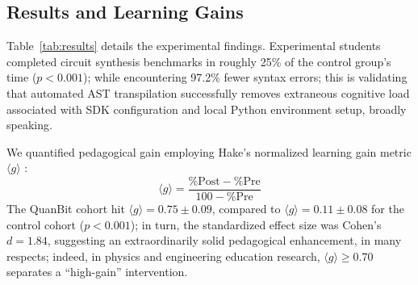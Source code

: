 \documentclass[conference]{IEEEtran}
\begin{document}
\begin{table}[t]
\caption{Quantitative Performance and Learning Efficacy Comparison ($N=30$)}
\label{tab:results}
\centering
\renewcommand{\arraystretch}{0.95}
\end{table}

\subsection{Results and Learning Gains}
Table~\ref{tab:results} details the experimental findings. Experimental students completed circuit synthesis benchmarks in roughly 25\% of the control group's time ($p < 0.001$); while encountering 97.2\% fewer syntax errors; this is validating that automated AST transpilation successfully removes extraneous cognitive load associated with SDK configuration and local Python environment setup, broadly speaking.

We quantified pedagogical gain employing Hake's normalized learning gain metric $\langle g \rangle$ \cite{b14}:
\begin{equation}
\langle g \rangle = \frac{\% \text{Post} - \% \text{Pre}}{100 - \% \text{Pre}}
\end{equation}
The QuanBit cohort hit $\langle g \rangle = 0.75 \pm 0.09$, compared to $\langle g \rangle = 0.11 \pm 0.08$ for the control cohort ($p < 0.001$); in turn, the standardized effect size was Cohen's $d = 1.84$, suggesting an extraordinarily solid pedagogical enhancement, in many respects; indeed, in physics and engineering education research, $\langle g \rangle \ge 0.70$ separates a ``high-gain'' intervention.
\end{document}
